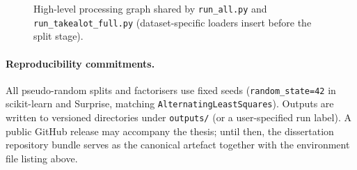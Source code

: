 \begin{figure}[htbp]
  \centering
  \caption{High-level processing graph shared by \texttt{run\_all.py} and \texttt{run\_takealot\_full.py} (dataset-specific loaders insert before the split stage).}
  \label{fig:method_code_pipeline}
\end{figure}

\paragraph{Reproducibility commitments.}
All pseudo-random splits and factorisers use fixed seeds (\texttt{random\_state=42} in scikit-learn and Surprise, matching \texttt{AlternatingLeastSquares}). Outputs are written to versioned directories under \texttt{outputs/} (or a user-specified run label). A public GitHub release may accompany the thesis; until then, the dissertation repository bundle serves as the canonical artefact together with the environment file listing above.
